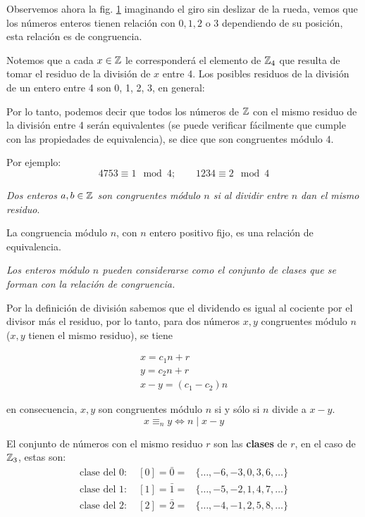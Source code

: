 Observemos ahora la fig. \ref{fig:relojconrecta} imaginando el giro sin deslizar de la rueda, vemos que los números enteros tienen relación con $0, 1, 2$ o $3$ dependiendo de su posición, esta relación es de congruencia.

\begin{figure}[H]
	\centering
	
	\caption{}
	\label{fig:relojconrecta}
\end{figure}

Notemos que a cada $x \in \mathbb{Z}$ le corresponderá el elemento de $\mathbb{Z}_4$ que resulta de tomar el residuo de la división de $x$ entre 4. Los posibles residuos de la división de un entero entre 4 son 0, 1, 2, 3, en general:

Por lo tanto, podemos decir que todos los números de $\mathbb{Z}$ con el mismo residuo de la división entre 4 serán equivalentes (se puede verificar fácilmente que cumple con las propiedades de equivalencia), se dice que son congruentes módulo 4.

Por ejemplo:
\[ 4753 \equiv 1 \mod 4; \qquad 1234 \equiv 2 \mod 4 \]

\emph{Dos enteros $a, b \in \mathbb{Z}$ son congruentes módulo $n$ si al dividir entre $n$ dan el mismo residuo}.

\begin{fmd-proposition}
	La congruencia módulo $n$, con $n$ entero positivo fijo, es una relación de equivalencia.
\end{fmd-proposition}

\emph{Los enteros módulo $n$ pueden considerarse como el conjunto de clases que se forman con la relación de congruencia.}

Por la definición de división sabemos que el dividendo es igual al cociente por el divisor más el residuo, por lo tanto, para dos números $x, y$ congruentes módulo $n$ ($x, y$ tienen el mismo residuo), se tiene

\[ \begin{array}{c}
	x = c_1n + r \\
	y = c_2n + r \\ \hline
	x - y = (c_1 - c_2)n
\end{array} \]

en consecuencia, $x, y$ son congruentes módulo $n$ si y sólo si $n$ divide a $x - y$.
\[ x \equiv_{n} y \iff n \mid x - y \]

El conjunto de números con el mismo residuo $r$ son las \textbf{clases} de $r$, en el caso de $\mathbb{Z}_3$, estas son:
\[ \begin{split}
	\mbox{clase del 0}: \quad [0] = \bar{0} =& \{\dots, -6, -3, 0, 3, 6, \dots \}\\
	\mbox{clase del 1}: \quad [1] = \bar{1} =& \{\dots, -5, -2, 1, 4, 7, \dots \}\\
	\mbox{clase del 2}: \quad [2] = \bar{2} =& \{\dots, -4, -1, 2, 5, 8, \dots \}\\
\end{split} \]

